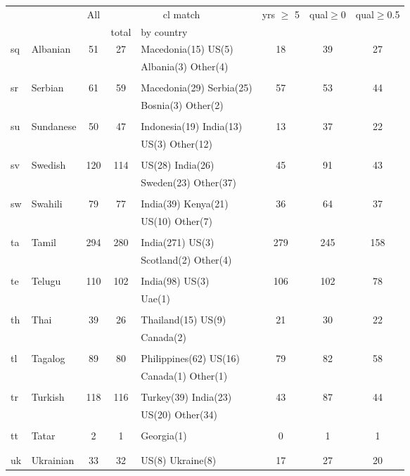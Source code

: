 \begin{figure}[h]
\centering
\begin{tabular}{llcclccc}
&&All&\multicolumn{2}{c}{cl match}&yrs $\geq$ 5&qual$\geq$0&qual$\geq$0.5\\
&&&total&by country&&\\
\hline\hline
sq&Albanian&51&27&Macedonia(15) US(5) &18&39&27\\
&&&&Albania(3) Other(4) &&&\\
&&&&&&&\\
sr&Serbian&61&59&Macedonia(29) Serbia(25) &57&53&44\\
&&&&Bosnia(3) Other(2) &&&\\
&&&&&&&\\
su&Sundanese&50&47&Indonesia(19) India(13) &13&37&22\\
&&&&US(3) Other(12) &&&\\
&&&&&&&\\
sv&Swedish&120&114&US(28) India(26) &45&91&43\\
&&&&Sweden(23) Other(37) &&&\\
&&&&&&&\\
sw&Swahili&79&77&India(39) Kenya(21) &36&64&37\\
&&&&US(10) Other(7) &&&\\
&&&&&&&\\
ta&Tamil&294&280&India(271) US(3) &279&245&158\\
&&&&Scotland(2) Other(4) &&&\\
&&&&&&&\\
te&Telugu&110&102&India(98) US(3) &106&102&78\\
&&&&Uae(1) &&&\\
&&&&&&&\\
th&Thai&39&26&Thailand(15) US(9) &21&30&22\\
&&&&Canada(2) &&&\\
&&&&&&&\\
tl&Tagalog&89&80&Philippines(62) US(16) &79&82&58\\
&&&&Canada(1) Other(1) &&&\\
&&&&&&&\\
tr&Turkish&118&116&Turkey(39) India(23) &43&87&44\\
&&&&US(20) Other(34) &&&\\
&&&&&&&\\
tt&Tatar&2&1&Georgia(1) &0&1&1\\
&&&&&&&\\
&&&&&&&\\
uk&Ukrainian&33&32&US(8) Ukraine(8) &17&27&20\\

\end{tabular}
\end{figure}
